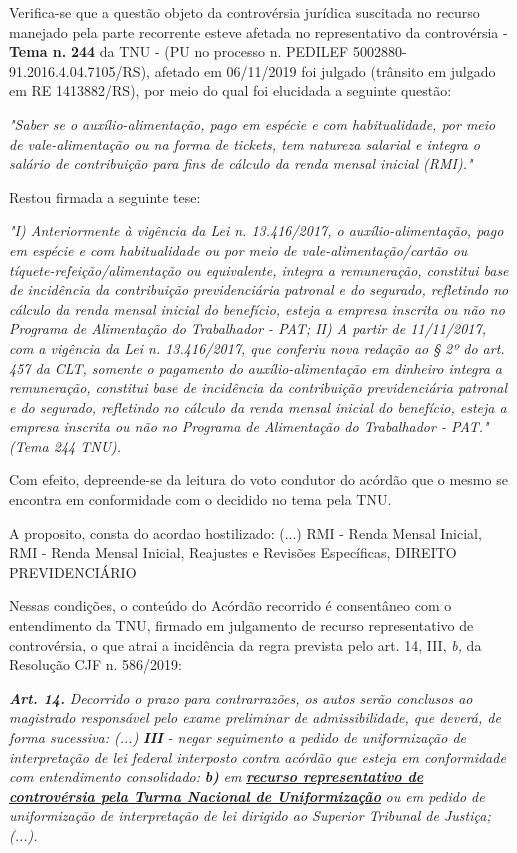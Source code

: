 \documentclass[12pt]{article}
\begin{document}
\justifying
\noindent Verifica-se que a questão objeto da controvérsia jurídica suscitada no recurso manejado pela parte recorrente esteve afetada no representativo da controvérsia - \textbf{Tema n. }\textbf{244} da TNU - (PU no processo n. PEDILEF 5002880-91.2016.4.04.7105/RS),  afetado em 06/11/2019 foi julgado (trânsito em julgado em RE 1413882/RS), por meio do qual foi elucidada a seguinte questão:

\noindent \textit{"Saber se o auxílio-alimentação, pago em espécie e com habitualidade, por meio de vale-alimentação ou na forma de tickets, tem natureza salarial e integra o salário de contribuição para fins de cálculo da renda mensal inicial (RMI)."}

\noindent Restou firmada a seguinte tese:

\noindent \textit{"I) Anteriormente à vigência da Lei n. 13.416/2017, o auxílio-alimentação, pago em espécie e com habitualidade ou por meio de vale-alimentação/cartão ou tíquete-refeição/alimentação ou equivalente, integra a remuneração, constitui base de incidência da contribuição previdenciária patronal e do segurado, refletindo no cálculo da renda mensal inicial do benefício, esteja a empresa inscrita ou não no Programa de Alimentação do Trabalhador - PAT; II) A partir de 11/11/2017, com a vigência da Lei n. 13.416/2017, que conferiu nova redação ao § 2º do art. 457 da CLT, somente o pagamento do auxílio-alimentação em dinheiro integra a remuneração, constitui base de incidência da contribuição previdenciária patronal e do segurado, refletindo no cálculo da renda mensal inicial do benefício, esteja a empresa inscrita ou não no Programa de Alimentação do Trabalhador - PAT." (Tema 244 TNU).}

\noindent Com efeito, depreende-se da leitura do voto condutor do acórdão que o mesmo se encontra em conformidade com o decidido no  tema pela TNU.

\noindent A proposito, consta do acordao hostilizado: (...) RMI - Renda Mensal Inicial, RMI - Renda Mensal Inicial, Reajustes e Revisões Específicas, DIREITO PREVIDENCIÁRIO

\noindent Nessas condições, o conteúdo do Acórdão recorrido é consentâneo com o entendimento da TNU, firmado em julgamento de recurso representativo de controvérsia, o que atrai a incidência da regra prevista pelo art. 14, III, \textit{b,} da Resolução CJF n. 586/2019:

\noindent \textit{\textbf{Art. 14.}}\textit{ Decorrido o prazo para contrarrazões, os autos serão conclusos ao magistrado responsável pelo exame preliminar de admissibilidade, que deverá, de forma sucessiva: (...) }\textit{\textbf{III }}\textit{- negar seguimento a pedido de uniformização de interpretação de lei federal interposto contra acórdão que esteja em conformidade com entendimento consolidado: }\textit{\textbf{b)}}\textit{ em }\uline{\textit{\textbf{recurso representativo de controvérsia pela Turma Nacional de Uniformização}}}\textit{ ou em pedido de uniformização de interpretação de lei dirigido ao Superior Tribunal de Justiça;(...).}
\end{document}
